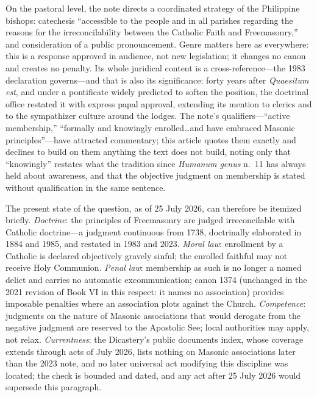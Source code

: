 \noindent
On the pastoral level, the note directs a coordinated strategy of the Philippine bishops: catechesis ``accessible to the people and in all parishes regarding the reasons for the irreconcilability between the Catholic Faith and Freemasonry,'' and consideration of a public pronouncement. Genre matters here as everywhere: this is a response approved in audience, not new legislation; it changes no canon and creates no penalty. Its whole juridical content is a cross-reference---the 1983 declaration governs---and that is also its significance: forty years after \emph{Quaesitum est}, and under a pontificate widely predicted to soften the position, the doctrinal office restated it with express papal approval, extending its mention to clerics and to the sympathizer culture around the lodges. The note's qualifiers---``active membership,'' ``formally and knowingly enrolled\ldots and have embraced Masonic principles''---have attracted commentary; this article quotes them exactly and declines to build on them anything the text does not build, noting only that ``knowingly'' restates what the tradition since \emph{Humanum genus} n.~11 has always held about awareness, and that the objective judgment on membership is stated without qualification in the same sentence.

The present state of the question, as of 25 July 2026, can therefore be itemized briefly. \emph{Doctrine}: the principles of Freemasonry are judged irreconcilable with Catholic doctrine---a judgment continuous from 1738, doctrinally elaborated in 1884 and 1985, and restated in 1983 and 2023. \emph{Moral law}: enrollment by a Catholic is declared objectively gravely sinful; the enrolled faithful may not receive Holy Communion. \emph{Penal law}: membership as such is no longer a named delict and carries no automatic excommunication; canon 1374 (unchanged in the 2021 revision of Book VI in this respect: it names no association) provides imposable penalties where an association plots against the Church. \emph{Competence}: judgments on the nature of Masonic associations that would derogate from the negative judgment are reserved to the Apostolic See; local authorities may apply, not relax. \emph{Currentness}: the Dicastery's public documents index, whose coverage extends through acts of July 2026, lists nothing on Masonic associations later than the 2023 note, and no later universal act modifying this discipline was located; the check is bounded and dated, and any act after 25 July 2026 would supersede this paragraph.
